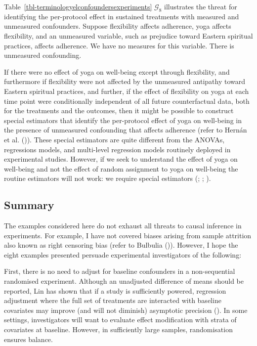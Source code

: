 \documentclass[
  single column]{article}
\begin{document}
Table~\ref{tbl-terminologyelconfoundersexperiments} \(\mathcal{G}_{8}\)
illustrates the threat for identifying the per-protocol effect in
sustained treatments with measured and unmeasured confounders. Suppose
flexibility affects adherence, yoga affects flexibility, and an
unmeasured variable, such as prejudice toward Eastern spiritual
practices, affects adherence. We have no measures for this variable.
There is unmeasured confounding.

If there were no effect of yoga on well-being except through
flexibility, and furthermore if flexibility were not affected by the
unmeasured antipathy toward Eastern spiritual practices, and further, if
the effect of flexibility on yoga at each time point were conditionally
independent of all future counterfactual data, both for the treatments
and the outcomes, then it might be possible to construct special
estimators that identify the per-protocol effect of yoga on well-being
in the presence of unmeasured confounding that affects adherence (refer
to Hernán et al. ()). These special
estimators are quite different from the ANOVAs, regressions models, and
multi-level regression models routinely deployed in experimental
studies. However, if we seek to understand the effect of yoga on
well-being and not the effect of random assignment to yoga on well-being
the routine estimators will not work: we require special estimators
(;
;
).

\subsection{Summary}\label{summary}

The examples considered here do not exhaust all threats to causal
inference in experiments. For example, I have not covered biases arising
from sample attrition also known as right censoring bias (refer to
Bulbulia ()). However, I hope the
eight examples presented persuade experimental investigators of the
following:

First, there is no need to adjust for baseline confounders in a
non-sequential randomised experiment. Although an unadjusted difference
of means should be reported, Lin has shown that if a study is
sufficiently powered, regression adjustment where the full set of
treatments are interacted with baseline covariates may improve (and will
not diminish) asymptotic precision
(). In some settings,
investigators will want to evaluate effect modification with strata of
covariates at baseline. However, in sufficiently large samples,
randomisation ensures balance.
\end{document}

